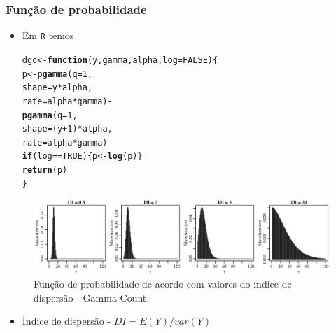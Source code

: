 \documentclass[10pt, aspectratio=169]{beamer}\usepackage[]{graphicx}\usepackage[]{color}
\makeatletter
\newcommand{\hlnum}[1]{\textcolor[rgb]{0.686,0.059,0.569}{#1}}%
\newcommand{\hlopt}[1]{\textcolor[rgb]{0,0,0}{#1}}%
\newcommand{\hlstd}[1]{\textcolor[rgb]{0.345,0.345,0.345}{#1}}%
\newcommand{\hlkwa}[1]{\textcolor[rgb]{0.161,0.373,0.58}{\textbf{#1}}}%
\newcommand{\hlkwb}[1]{\textcolor[rgb]{0.69,0.353,0.396}{#1}}%
\newcommand{\hlkwc}[1]{\textcolor[rgb]{0.333,0.667,0.333}{#1}}%
\newcommand{\hlkwd}[1]{\textcolor[rgb]{0.737,0.353,0.396}{\textbf{#1}}}%
\newenvironment{kframe}{%
 \def\at@end@of@kframe{}%
 \ifinner\ifhmode%
  \def\at@end@of@kframe{\end{minipage}}%
  \begin{minipage}{\columnwidth}%
 \fi\fi%
 \def\FrameCommand##1{\hskip\@totalleftmargin \hskip-\fboxsep
 \colorbox{shadecolor}{##1}\hskip-\fboxsep
     \hskip-\linewidth \hskip-\@totalleftmargin \hskip\columnwidth}%
 \MakeFramed {\advance\hsize-\width
   \@totalleftmargin\z@ \linewidth\hsize
   \@setminipage}}%
 {\par\unskip\endMakeFramed%
 \at@end@of@kframe}
\newenvironment{knitrout}{}{} %
\makeatother
\begin{document}
\begin{frame}[fragile]
  \frametitle{Função de probabilidade}
  \begin{itemize}
  \item Em \texttt{R} temos

\begin{knitrout}
\color{fgcolor}\begin{kframe}
\begin{alltt}
\hlstd{dgc} \hlkwb{<-} \hlkwa{function}\hlstd{(}\hlkwc{y}\hlstd{,} \hlkwc{gamma}\hlstd{,} \hlkwc{alpha}\hlstd{,} \hlkwc{log} \hlstd{=} \hlnum{FALSE}\hlstd{) \{}
  \hlstd{p} \hlkwb{<-} \hlkwd{pgamma}\hlstd{(}\hlkwc{q} \hlstd{=} \hlnum{1}\hlstd{,}
              \hlkwc{shape} \hlstd{= y} \hlopt{*} \hlstd{alpha,}
              \hlkwc{rate} \hlstd{= alpha} \hlopt{*} \hlstd{gamma)} \hlopt{-}
    \hlkwd{pgamma}\hlstd{(}\hlkwc{q} \hlstd{=} \hlnum{1}\hlstd{,}
           \hlkwc{shape} \hlstd{= (y} \hlopt{+} \hlnum{1}\hlstd{)} \hlopt{*} \hlstd{alpha,}
           \hlkwc{rate} \hlstd{= alpha} \hlopt{*} \hlstd{gamma)}
  \hlkwa{if}\hlstd{(log} \hlopt{==} \hlnum{TRUE}\hlstd{) \{p} \hlkwb{<-} \hlkwd{log}\hlstd{(p)\}}
  \hlkwd{return}\hlstd{(p)}
\hlstd{\}}
\end{alltt}
\end{kframe}
\end{knitrout}

\end{itemize}
\end{frame}

\begin{frame}[fragile]
\begin{figure}[h]
\includegraphics[scale=0.6]{images/GammaCount.png}
\caption{Função de probabilidade de acordo com valores do índice de dispersão - Gamma-Count.}
\label{Fig2}
\centering
\end{figure}
\begin{itemize}
\item Índice de dispersão - $DI =  E(Y)/var(Y)$
\end{itemize}
\end{frame}
\end{document}
